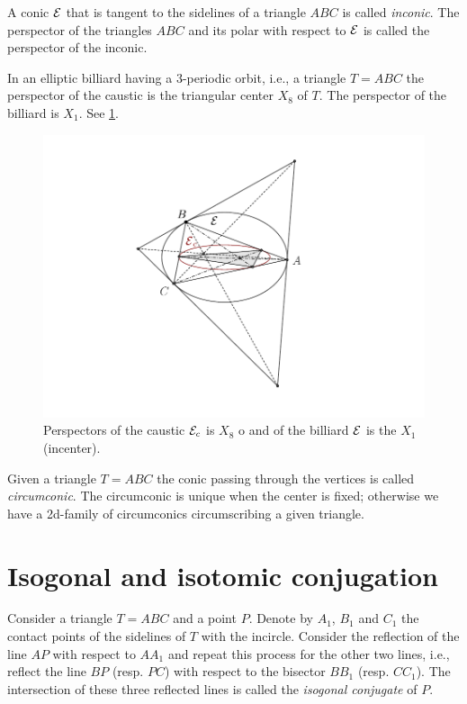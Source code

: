 A conic $\mathcal{E}$ that is tangent to the sidelines of a triangle $ABC$ is called {\em inconic}. The perspector of the triangles $ABC$ and its polar with respect to $\mathcal{E}$ is called the perspector of the inconic.

In   an elliptic  billiard having a 3-periodic orbit, i.e., a triangle $T=ABC$ the perspector of the caustic is the triangular center $X_8$ of $T$. The perspector of the billiard is $X_1$. See \cref{fig:appA-X8-X1-perspectors}.
\begin{figure}
    \centering
    \includegraphics[scale=0.7]{zappA/pics/pics-appA-170-inconic-billiardggb.pdf}
    \caption{Perspectors of the caustic $\mathcal{E}_c$ is $X_8$ o and of the billiard $\mathcal{E}$ is the $X_1$ (incenter). }
    \label{fig:appA-X8-X1-perspectors}
\end{figure}

Given a triangle $T=ABC$ the conic passing through the vertices is called {\em circumconic}. The circumconic is unique when the center is fixed; otherwise we have a 2d-family of circumconics circumscribing a given triangle. 



	\section{Isogonal and isotomic conjugation}
	
	Consider a triangle $T=ABC$ and a point $P$. Denote by $A_1$, $B_1$ and $C_1$ the contact points of the sidelines of $T$ with the incircle. Consider the reflection of the line $AP$ with respect to $AA_1$ and repeat this process for the other two lines, i.e., reflect the line $BP$ (resp. $PC$) with respect to the bisector $BB_1$ (resp. $CC_1$).
	The intersection of these three reflected lines is called the {\em isogonal conjugate} of $P$. 
	
